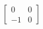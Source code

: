 \documentclass[12pt]{article}
\begin{document}
    \[ \left[ \begin{array}{rr}
        0 & 0\\
        -1 & 0
    \end{array} \right] \]
\end{document}
